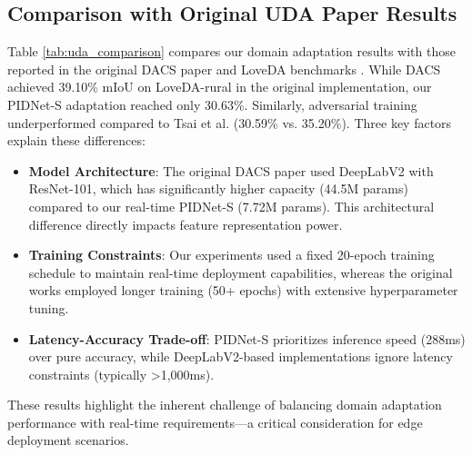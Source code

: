 \documentclass{article}
\begin{document}
\begin{multicols}{2}
        



		\subsection{Comparison with Original UDA Paper Results}
		Table \ref{tab:uda_comparison} compares our domain adaptation results with those reported in the original DACS paper \cite{tranheden2021dacs} and LoveDA benchmarks \cite{loveda2021}. While DACS achieved 39.10\% mIoU on LoveDA-rural in the original implementation, our PIDNet-S adaptation reached only 30.63\%. Similarly, adversarial training underperformed compared to Tsai et al. \cite{tsai2018learning} (30.59\% vs. 35.20\%). Three key factors explain these differences:
		
		\begin{itemize}
			\item \textbf{Model Architecture}: The original DACS paper used DeepLabV2 with ResNet-101, which has significantly higher capacity (44.5M params) compared to our real-time PIDNet-S (7.72M params). This architectural difference directly impacts feature representation power.
			\item \textbf{Training Constraints}: Our experiments used a fixed 20-epoch training schedule to maintain real-time deployment capabilities, whereas the original works employed longer training (50+ epochs) with extensive hyperparameter tuning.
			\item \textbf{Latency-Accuracy Trade-off}: PIDNet-S prioritizes inference speed (288ms) over pure accuracy, while DeepLabV2-based implementations ignore latency constraints (typically >1,000ms).
		\end{itemize}
		
		\justifying
		These results highlight the inherent challenge of balancing domain adaptation performance with real-time requirements—a critical consideration for edge deployment scenarios.
		
		\begin{center}
			\label{tab:uda_comparison}
		\end{center} 


\end{multicols}
\end{document}
